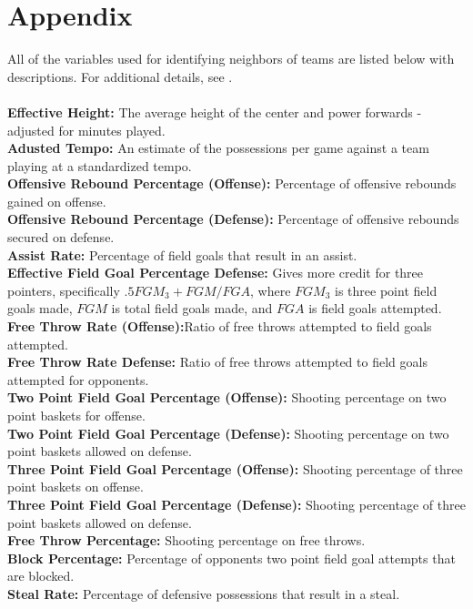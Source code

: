 \documentclass[letterpaper,12pt]{article}
\begin{document}
\section*{Appendix}
All of the variables used for identifying neighbors of teams are listed below with descriptions. For additional details, see \cite{kenpom.com}.\\
\\
\textbf{Effective Height:} The average height of the center and power forwards - adjusted for minutes played.  \\
\textbf{Adusted Tempo:} An estimate of the possessions per game against a team playing at a standardized tempo. \\
\textbf{Offensive Rebound Percentage (Offense):} Percentage of offensive rebounds gained on offense.\\
\textbf{Offensive Rebound Percentage (Defense):} Percentage of offensive rebounds secured on defense.\\
\textbf{Assist Rate:} Percentage of field goals that result in an assist.\\
\textbf{Effective Field Goal Percentage Defense:} Gives more credit for three pointers, specifically $.5 FGM_3 + FGM /FGA$, where $FGM_3$ is three point field goals made, $FGM$ is total field goals made, and  $FGA$ is field goals attempted. \\
\textbf{Free Throw Rate (Offense):}Ratio of free throws attempted to field goals attempted. \\
\textbf{Free Throw Rate Defense:} Ratio of free throws attempted to field goals attempted for opponents. \\
\textbf{Two Point Field Goal Percentage (Offense):} Shooting percentage on two point baskets for offense. \\
\textbf{Two Point Field Goal Percentage (Defense):} Shooting percentage on two point baskets allowed on defense.\\
\textbf{Three Point Field Goal Percentage (Offense):} Shooting percentage of three point baskets on offense.\\
\textbf{Three Point Field Goal Percentage (Defense):} Shooting percentage of three point baskets allowed on defense.\\
\textbf{Free Throw Percentage:} Shooting percentage on free throws.\\
\textbf{Block Percentage:} Percentage of opponents two point field goal attempts that are blocked.\\
\textbf{Steal Rate:} Percentage of defensive possessions that result in a steal. \\
\end{document}
